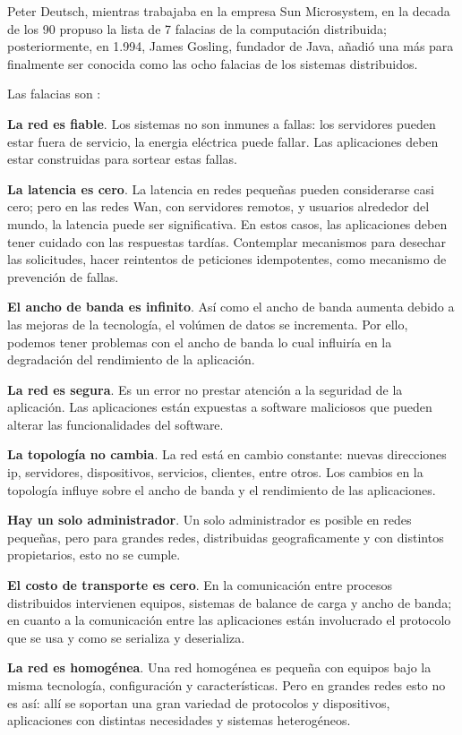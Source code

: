 \begin{tcolorbox}
	[colback=red!5!white,colframe=red!75!black,fonttitle=\bfseries,title=Historia de las falacias]
		Peter Deutsch, mientras trabajaba en la empresa Sun Microsystem, en la decada de los 90 propuso la lista de 7 falacias de la computación distribuida; posteriormente, en 1.994, James Gosling, fundador de Java,  añadió una más para finalmente ser conocida como las ocho falacias de los sistemas distribuidos.
\end{tcolorbox}


Las falacias son  \cite{Hoogen2004, Xu2022}:
\begin{description}
	\item \textbf{La red es fiable}.
	 Los sistemas no son inmunes a fallas: los servidores pueden estar fuera de servicio, la energia eléctrica puede fallar. Las aplicaciones deben estar construidas para sortear estas fallas.
	\item \textbf{La latencia es cero}. 
	La \gls{latencia} en redes pequeñas pueden considerarse casi cero; pero en las redes Wan, con servidores remotos, y usuarios alrededor del mundo, la latencia puede ser significativa.
	En estos casos, las aplicaciones deben tener cuidado con las respuestas tardías. Contemplar mecanismos para desechar las solicitudes, hacer reintentos de \gls{peticiones idempotentes}, como mecanismo de prevención de fallas.
	\item \textbf{El ancho de banda es infinito}.
	Así como el ancho de banda aumenta debido a las mejoras de la tecnología, el volúmen de datos se incrementa. Por ello,  podemos  tener problemas con el ancho de banda lo cual influiría en la degradación del rendimiento de la aplicación.
	\item \textbf{La red es segura}.
	Es un error no prestar atención a la seguridad de la aplicación. Las aplicaciones están expuestas a software maliciosos que pueden alterar las funcionalidades del software.
	\item \textbf{La topología no cambia}.
	La red está en cambio constante: nuevas direcciones ip, servidores, dispositivos, servicios, clientes,  entre otros. Los cambios en la topología influye sobre el ancho de banda y el rendimiento de las aplicaciones.	
	\item \textbf{Hay un solo administrador}.
	Un solo administrador es posible en redes pequeñas, pero para  grandes redes, distribuidas geograficamente y con distintos propietarios, esto no se cumple. 
	\item \textbf{El costo de transporte es cero}.
 	En la comunicación entre procesos distribuidos intervienen equipos, sistemas de balance de carga y ancho de banda; en cuanto a la comunicación entre las aplicaciones están involucrado el protocolo que se usa y como se serializa y deserializa.
	\item \textbf{La red es homogénea}.
	Una red homogénea es  pequeña con equipos bajo la misma tecnología, configuración y características. Pero en grandes redes esto no es así: allí se soportan una gran variedad de protocolos y dispositivos, aplicaciones con distintas necesidades y sistemas heterogéneos.
	
	
\end{description}


